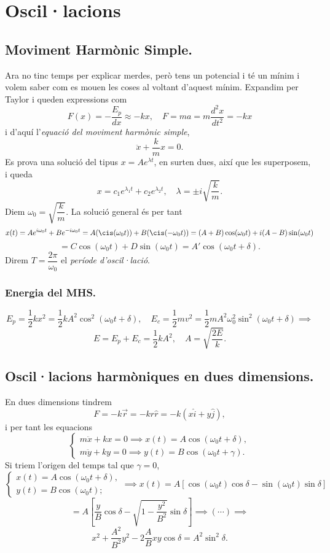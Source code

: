 \chapter{Oscil·lacions}
\section{Moviment Harmònic Simple.}
Ara no tinc temps per explicar merdes, però tens un potencial i té un mínim i volem saber com es mouen les coses al voltant d'aquest mínim. Expandim per Taylor i queden expressions com
\[
F(x)=-\dfrac{E_p}{dx}\approx-kx,\quad F=ma=m\dfrac{d^2x}{dt^2}=-kx
\]
i d'aquí l'\textit{equació del moviment harmònic simple},
\[
\ddot x+\dfrac{k}{m}x=0.
\]
Es prova una solució del tipus $x=Ae^{\lambda t}$, en surten dues, així que les superposem, i queda
\[
x=c_1e^{\lambda_1t}+c_2e^{\lambda_2t},\quad\lambda=\pm i\sqrt{\dfrac{k}{m}}.
\]
Diem $\omega_0=\sqrt{\dfrac{k}{m}}$. La solució general és per tant
\[
x(t)=Ae^{i\omega_0t}+Be^{-i\omega_0t}=A(\cis(\omega_0t))+B(\cis(-\omega_0t))=(A+B)\cos(\omega_0t)+i(A-B)\sin(\omega_0t)
\]\[=C\cos(\omega_0t)+D\sin(\omega_0t)=\boxed{A'\cos(\omega_0t+\delta).}\]
Direm $T=\dfrac{2\pi}{\omega_0}$ el \textit{període d'oscil·lació}.
\subsection{Energia del MHS.}
\[
E_p=\dfrac{1}{2}kx^2=\dfrac{1}{2}kA^2\cos^2(\omega_0t+\delta),\quad E_c=\dfrac{1}{2}mv^2=\dfrac{1}{2}mA^2\omega_0^2\sin^2(\omega_0t+\delta)\implies
\]
\[
E=E_p+E_c=\dfrac{1}{2}kA^2,\quad A=\sqrt{\dfrac{2E}{k}}.
\]
\section{Oscil·lacions harmòniques en dues dimensions.}
En dues dimensions tindrem
\[F=-k\vec r=-kr\hat r=-k(x\hat i+y\hat j),\]
i per tant les equacions
\[
\begin{cases}
m\ddot x+kx=0\implies x(t)=A\cos(\omega_0t+\delta),\\
m\ddot y+ky=0\implies y(t)=B\cos(\omega_0t+\gamma).
\end{cases}
\]
Si triem l'origen del temps tal que $\gamma = 0$,
\[
\begin{cases}
x(t)=A\cos(\omega_0t+\delta),\\
y(t)=B\cos(\omega_0t);
\end{cases}
\implies
x(t)=A[\cos(\omega_0t)\cos{\delta}-\sin(\omega_0t)\sin{\delta}]\]\[=A\left[\dfrac{y}{B}\cos{\delta}-\sqrt{1-\dfrac{y^2}{B^2}}\sin{\delta}\right]
\implies(\cdots)\implies\]
\[\boxed{x^2+\dfrac{A^2}{B^2}y^2-2\dfrac{A}{B}xy\cos{\delta}=A^2\sin^2{\delta}.}\]
